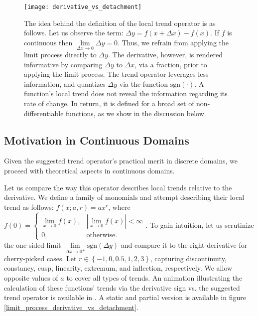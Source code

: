 \documentclass[11pt]{book}
\begin{document}
\begin{figure}[H]
\texttt{[image: derivative\_vs\_detachment]}
\caption{The idea behind the definition of the local trend operator is as follows. Let us observe the term: $\Delta y=f(x+\Delta x)-f(x)$. If $f$ is continuous then $\underset{\Delta x \to 0}{\lim}\Delta y = 0$. Thus, we refrain from applying the limit process directly to $\Delta y$. The derivative, however, is rendered informative by comparing $\Delta y$ to $\Delta x$, via a fraction, prior to applying the limit process. The trend operator leverages less information, and quantizes $\Delta y$ via the function $\text{sgn}\left(\cdot\right)$. A function’s local trend does not reveal the information regarding its rate of change. In return, it is defined for a broad set of non-differentiable functions, as we show in the discussion below.}
\end{figure}

\subsection{Motivation in Continuous Domains}
Given the suggested trend operator's practical merit in discrete domains, we proceed with theoretical aspects in continuous domains.

Let us compare the way this operator describes local trends relative to the derivative. We define a family of monomials and attempt describing their local trend as follows: $f\left(x ; a,r \right)=a x^r$, where $f\left(0\right)=\begin{cases}
\underset{x\to0}{\lim}f\left(x\right), & \left|\underset{x\to0}{\lim}f\left(x\right)\right|<\infty\\
0, & \text{otherwise.}
\end{cases}$. To gain intuition, let us scrutinize the one-sided limit $\underset{\Delta x\rightarrow0^{+}}{\lim}\text{sgn}\left(\Delta y\right)$ and compare it to the right-derivative for cherry-picked cases. Let $r \in \left\{-1, 0, 0.5, 1, 2, 3 \right\}$, capturing discontinuity, constancy, cusp, linearity, extremum, and inflection, respectively. We allow opposite values of $a$ to cover all types of trends. An animation illustrating the calculation of these functions' trends via the derivative sign vs. the suggested trend operator is available in \cite{shachar_2020}.
A static and partial version is available in figure \ref{limit_process_derivative_vs_detachment}.
\end{document}

